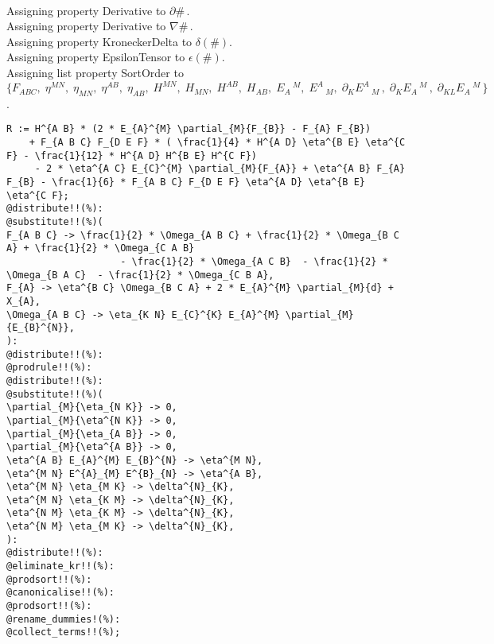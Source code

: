 \documentclass[11pt]{article}
\begin{document}
\\
Assigning property Derivative to $\partial{\#}\, $.
\\
Assigning property Derivative to $\nabla{\#}\, $.
\\
Assigning property KroneckerDelta to $\delta(\#)$.
\\
Assigning property EpsilonTensor to $\epsilon(\#)$.
\\
Assigning list property SortOrder to $\{{F}_{A B C},\; {\eta}^{M N},\; {\eta}_{M N},\; {\eta}^{A B},\; {\eta}_{A B},\; {H}^{M N},\; {H}_{M N},\; {H}^{A B},\; {H}_{A B},\; {E}_{A}\,^{M},\; {E}^{A}\,_{M},\; {\partial}_{K}{{E}^{A}\,_{M}}\, ,\; {\partial}_{K}{{E}_{A}\,^{M}}\, ,\; {\partial}_{K L}{{E}_{A}\,^{M}}\, \}$.
\\
{\color[named]{Blue}\begin{verbatim}
R := H^{A B} * (2 * E_{A}^{M} \partial_{M}{F_{B}} - F_{A} F_{B}) 
    + F_{A B C} F_{D E F} * ( \frac{1}{4} * H^{A D} \eta^{B E} \eta^{C F} - \frac{1}{12} * H^{A D} H^{B E} H^{C F})
     - 2 * \eta^{A C} E_{C}^{M} \partial_{M}{F_{A}} + \eta^{A B} F_{A} F_{B} - \frac{1}{6} * F_{A B C} F_{D E F} \eta^{A D} \eta^{B E} \eta^{C F};
@distribute!!(%):
@substitute!!(%)(
F_{A B C} -> \frac{1}{2} * \Omega_{A B C} + \frac{1}{2} * \Omega_{B C A} + \frac{1}{2} * \Omega_{C A B}
                    - \frac{1}{2} * \Omega_{A C B}  - \frac{1}{2} * \Omega_{B A C}  - \frac{1}{2} * \Omega_{C B A},
F_{A} -> \eta^{B C} \Omega_{B C A} + 2 * E_{A}^{M} \partial_{M}{d} + X_{A},
\Omega_{A B C} -> \eta_{K N} E_{C}^{K} E_{A}^{M} \partial_{M}{E_{B}^{N}},
):
@distribute!!(%):
@prodrule!!(%):
@distribute!!(%):
@substitute!!(%)(
\partial_{M}{\eta_{N K}} -> 0,
\partial_{M}{\eta^{N K}} -> 0,
\partial_{M}{\eta_{A B}} -> 0,
\partial_{M}{\eta^{A B}} -> 0,
\eta^{A B} E_{A}^{M} E_{B}^{N} -> \eta^{M N},
\eta^{M N} E^{A}_{M} E^{B}_{N} -> \eta^{A B},
\eta^{M N} \eta_{M K} -> \delta^{N}_{K},
\eta^{M N} \eta_{K M} -> \delta^{N}_{K},
\eta^{N M} \eta_{K M} -> \delta^{N}_{K},
\eta^{N M} \eta_{M K} -> \delta^{N}_{K},
):
@distribute!!(%):
@eliminate_kr!!(%):
@prodsort!!(%):
@canonicalise!!(%):
@prodsort!!(%):
@rename_dummies!(%):
@collect_terms!!(%);
\end{verbatim}}
\end{document}

